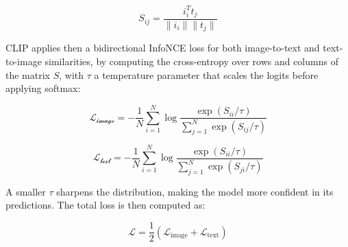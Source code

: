 \documentclass[a4paper, oneside, english]{sapthesis} %
\begin{document}
\begin{equation}\label{sim_matrix}
    S_{ij} = \frac{i_i^Tt_j}{\|i_i\| \| t_j\|}
\end{equation}

CLIP applies then a bidirectional InfoNCE loss for both image-to-text and text-to-image similarities, by computing the cross-entropy over rows and columns of the matrix $S$, with $\tau$ a temperature parameter that scales the logits before applying softmax:

\begin{equation} \label{L_image}
    \mathcal{L_{\text{image}}} = - \frac{1}{N} \sum_{i=1}^N \log \frac{\exp(S_{ii}/\tau)}{\sum_{j=1}^N \exp (S_{ij}/\tau)}
\end{equation}

\begin{equation} \label{L_text}
    \mathcal{L_{\text{text}}} = - \frac{1}{N} \sum_{i=1}^N \log \frac{\exp(S_{ii}/\tau)}{\sum_{j=1}^N \exp (S_{ji}/\tau)}
\end{equation}

A smaller $\tau$ sharpens the distribution, making the model more confident in its predictions. The total loss is then computed as:

\begin{equation}
    \mathcal{L} = \frac{1}{2} (\mathcal{L}_{\text{image}} + \mathcal{L}_{\text{text}})
\end{equation}
\end{document}
